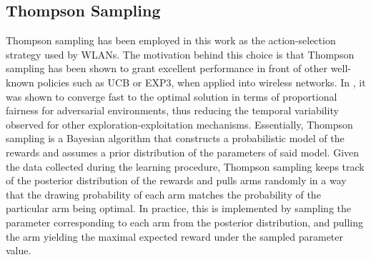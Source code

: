 \documentclass{article}
\begin{document}
\subsection{Thompson Sampling}
\label{subsection:thompson_sampling}
Thompson sampling has been employed in this work as the action-selection strategy used by WLANs. The motivation behind this choice is that Thompson sampling has been shown to grant excellent performance in front of other well-known policies such as UCB or EXP3, when applied into wireless networks. In \cite{wilhelmi2017collaborative}, it was shown to converge fast to the optimal solution in terms of proportional fairness for adversarial environments, thus reducing the temporal variability observed for other exploration-exploitation mechanisms. Essentially, Thompson sampling \cite{thompson1933likelihood} is a Bayesian algorithm that constructs a probabilistic model of the rewards and assumes a prior distribution of the parameters of said model. Given the data collected during the learning procedure, Thompson sampling keeps track of the posterior distribution of the rewards and pulls arms randomly in a way that the drawing probability of each arm matches the probability of the particular arm being optimal. In practice, this is implemented by sampling the parameter corresponding to each arm from the posterior distribution, and pulling the arm yielding the maximal expected reward under the sampled parameter value. 
\end{document}
